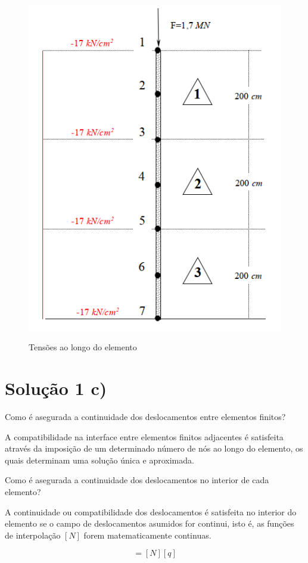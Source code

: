 \documentclass{article} %
\begin{document}
\begin{figure}[H]
	\centering
	\caption{Tensões ao longo do elemento}
	\includegraphics[width=0.5\linewidth]{tensao2}	
	\label{tensoes2}	
\end{figure}


\newpage

\section*{Solução 1 c)}

\vspace{15pt}

Como é asegurada a continuidade dos deslocamentos entre elementos finitos?\\
\vspace{5pt}

\noindent A compatibilidade na interface entre elementos finitos adjacentes é satisfeita através da imposição de um determinado número de nós ao longo do elemento, os quais determinam uma solução única e aproximada. \\
\vspace{1cm}

\noindent Como é asegurada a continuidade dos deslocamentos no interior de cada elemento?

\vspace{10pt}

\noindent A continuidade ou compatibilidade dos deslocamentos é satisfeita no interior do elemento se o campo de deslocamentos asumidos for continui, isto é, as funções de interpolação \([N]\) forem matematicamente continuas.

\begin{equation*}
[v]=[N][q]
\end{equation*}


%
%
\end{document}
